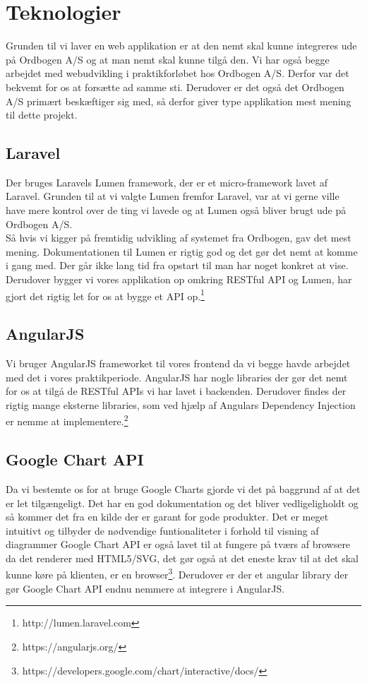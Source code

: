 \hypertarget{Teknologier}{}
\section{Teknologier}
Grunden til vi laver en web applikation er at den nemt skal kunne integreres ude på Ordbogen A/S  og at man nemt skal kunne tilgå den.
Vi har også begge arbejdet med webudvikling i praktikforløbet hos Ordbogen A/S. Derfor var det bekvemt for os at forsætte ad samme sti.
Derudover er det også det Ordbogen A/S primært beskæftiger sig med, så derfor giver type applikation mest mening til dette projekt.
\hypertarget{Laravel}{}
\subsection{Laravel}
\label{Laravel}
Der bruges Laravels Lumen framework, der er et micro-framework lavet af Laravel. Grunden til at vi valgte Lumen
fremfor Laravel, var at vi gerne ville have mere kontrol over de ting vi lavede og at Lumen også bliver brugt ude på Ordbogen A/S.
\\
Så hvis vi kigger på fremtidig udvikling af systemet fra Ordbogen, gav det mest mening.
Dokumentationen til Lumen er rigtig god og det gør det nemt at komme i gang med. Der går ikke lang tid fra opstart
til man har noget konkret at vise. 
Derudover bygger vi vores applikation op omkring RESTful API og Lumen, har gjort det rigtig let for os at bygge 
et API op.\footnote{http://lumen.laravel.com}
\hypertarget{AngularJS}{}
\subsection{AngularJS}
Vi bruger AngularJS frameworket til vores frontend da vi begge havde arbejdet med det
i vores praktikperiode. AngularJS har nogle libraries der gør det nemt for os at tilgå de RESTful APIs
vi har lavet i backenden. 
Derudover findes der rigtig mange eksterne libraries, som ved hjælp af Angulars Dependency Injection er nemme at implementere.\footnote{https://angularjs.org/}
\hypertarget{GoogleChartAPI}{}
\subsection{Google Chart API}
Da vi bestemte os for at bruge Google Charts gjorde vi det på baggrund af at det er let tilgængeligt.
Det har en god dokumentation og det bliver vedligeligholdt og så kommer det fra en kilde der er garant for gode produkter.
Det er meget intuitivt og tilbyder de nødvendige funtionaliteter i forhold til visning af diagrammer 
Google Chart API er også lavet til at fungere på tværs af browsere da det renderer med HTML5/SVG, 
det gør også at det eneste krav til at det skal kunne køre på klienten, er en browser\footnote{https://developers.google.com/chart/interactive/docs/}. 
Derudover er der et angular library der gør Google Chart API endnu nemmere at integrere i AngularJS.
